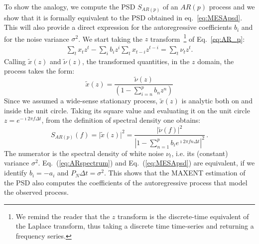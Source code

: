 \documentclass[twocolumn,showpacs,preprintnumbers,nofootinbib,prd,
superscriptaddress,10pt]{revtex4-1}
\begin{document}
To show the analogy, we compute the PSD $S_{AR(p)}$ of an $AR(p)$ process and we show that it is formally equivalent to the PSD obtained in eq.~\eqref{eq:MESApsd}. This will also provide a direct expression for the autoregressive coefficients $b_i$ and for the noise variance $\sigma^2$.
We start taking the $z$ transform~\footnote{We remind the reader that the $z$ transform is the discrete-time equivalent of the Laplace transform, thus taking a discrete time time-series and returning a frequency series.} of Eq.~\eqref{eq:AR_p}: 
\begin{align}
    \sum_t x_t z^t - \sum_i b_i z^i\sum_t x_{t - i} z^{t - i} = \sum_t \nu_t z^t.
\end{align}
Calling $\tilde x(z)$ and $\tilde \nu (z)$, the transformed quantities, 
in the $z$ domain, the process takes the form:
\begin{equation}
    \tilde x(z) = \frac{\tilde\nu(z)}{\left(1 - \sum_{i = n}^p b_n z^n \right)}
\end{equation}
Since we assumed a wide-sense stationary process, $\tilde{x}(z)$ is analytic both on and inside the unit circle. Taking its square value and evaluating it on the unit circle $z = e^{-\imath 2 \pi f \Delta t}$, from the definition of spectral density one obtains:
\begin{equation}\label{eq:ARspectrum}
    S_{AR(p)}(f) = \vert \tilde x(z)\vert ^ 2 = 
    \frac{\vert \tilde \nu(f) \vert ^ 2}{\left\vert 1 - \sum_{n = 1}^p b_i e^{\imath 2 \pi f n \Delta t} \right\vert ^ 2}\,.
\end{equation}
The numerator is the spectral density of white noise $\nu_t$, i.e. its (constant) variance $\sigma^2$.
Eq.~(\eqref{eq:ARspectrum}) and Eq.~(\eqref{eq:MESApsd}) are equivalent, if we identify $b_i = - a_i$ and $P_N \Delta t= \sigma ^ 2$.
This shows that the MAXENT estimation of the PSD also computes the coefficients of the autoregressive 
process that model the observed process.
\end{document}
